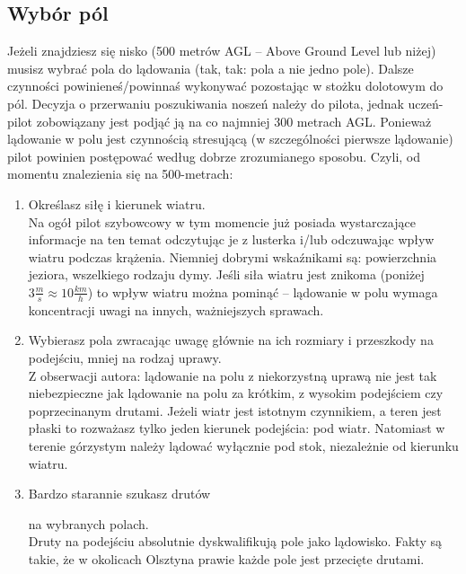 \documentclass{article}
\begin{document}
\subsection{Wybór pól}
Jeżeli znajdziesz się nisko (500 metrów AGL -- Above Ground Level
lub niżej) musisz wybrać pola do lądowania (tak, tak: pola a nie
jedno pole). Dalsze czynności powinieneś/powinnaś
wykonywać pozostając w stożku dolotowym do pól. Decyzja o przerwaniu
poszukiwania noszeń należy do pilota, jednak uczeń-pilot zobowiązany jest
podjąć ją na co najmniej 300 metrach AGL. Ponieważ lądowanie w polu 
jest czynnością stresującą (w szczególności pierwsze lądowanie)
pilot powinien postępować według dobrze zrozumianego
sposobu. Czyli, od momentu znalezienia się na 500-metrach:
\begin{enumerate}
\item Określasz siłę i kierunek wiatru. \\
    Na ogół pilot szybowcowy w tym momencie już posiada
    wystarczające informacje na ten temat odczytując je z lusterka i/lub
    odczuwając wpływ wiatru podczas krążenia. Niemniej dobrymi wskaźnikami są:
    powierzchnia jeziora, wszelkiego rodzaju dymy. Jeśli siła wiatru jest
    znikoma (poniżej $3\frac{m}{s} \approx 10\frac{km}{h}$) to wpływ
    wiatru można pominąć -- lądowanie w polu wymaga koncentracji uwagi
    na innych, ważniejszych sprawach.

\item Wybierasz pola zwracając uwagę głównie na ich rozmiary i przeszkody na
    podejściu, mniej na rodzaj uprawy.\\
    Z obserwacji autora: lądowanie
    na polu z niekorzystną uprawą nie jest tak niebezpieczne jak lądowanie
    na polu za krótkim, z wysokim podejściem czy poprzecinanym drutami.
    Jeżeli wiatr jest istotnym czynnikiem, a teren jest płaski
    to rozważasz tylko jeden kierunek podejścia: pod wiatr. Natomiast
    w terenie górzystym należy lądować wyłącznie pod stok, niezależnie
    od kierunku wiatru.

\item \begin{bf}Bardzo starannie szukasz drutów\end{bf} na wybranych
    polach.\\
    Druty na podejściu absolutnie dyskwalifikują pole jako lądowisko.
    Fakty są takie, że w okolicach Olsztyna prawie każde pole jest
    przecięte drutami.


\end{enumerate}
\end{document}
